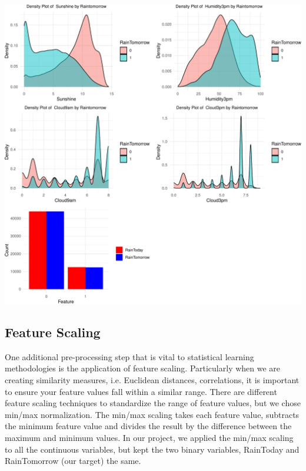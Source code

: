 \documentclass[
]{article}
\begin{document}
\begin{flushright}\includegraphics{Rain_Australia_files/figure-latex/density-1} \end{flushright}

\hypertarget{feature-scaling}{%
\subsection{Feature Scaling}\label{feature-scaling}}

One additional pre-processing step that is vital to statistical learning
methodologies is the application of feature scaling. Particularly when
we are creating similarity measures, i.e. Euclidean distances,
correlations, it is important to ensure your feature values fall within
a similar range. There are different feature scaling techniques to
standardize the range of feature values, but we chose min/max
normalization. The min/max scaling takes each feature value, subtracts
the minimum feature value and divides the result by the difference
between the maximum and minimum values. In our project, we applied the
min/max scaling to all the continuous variables, but kept the two binary
variables, RainToday and RainTomorrow (our target) the same.
\end{document}
